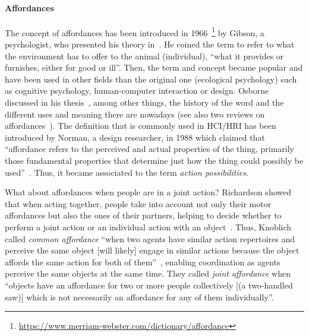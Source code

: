\documentclass[a4paper,11pt,twoside]{StyleThese}
\begin{document}
\paragraph{Affordances}
The concept of affordances has been introduced in 1966~\footnote{\url{https://www.merriam-webster.com/dictionary/affordance}} by Gibson, a psychologist, who presented his theory in~\cite{gibson_1979_theory}. He coined the term to refer to what the environment has to offer to the animal (individual), ``what it provides or furnishes, either for good or ill''. Then, the term and concept became popular and have been used in other fields than the original one (ecological psychology) such as cognitive psychology, human-computer interaction or design. Osborne discussed in his thesis~\cite{osborne_2014_ecological}, among other things, the history of the word and the different uses and meaning there are nowadays (see also two reviews on affordances~\cite{jamone_2016_affordances, bach_2014_affordance}). The definition that is commonly used in HCI/HRI has been introduced by Norman, a design researcher, in 1988 which claimed that ``affordance refers to the perceived and actual properties of the thing, primarily those fundamental properties that determine just how the thing could possibly be used''~\cite[p.~9]{norman_1988_psychology}. Thus, it became associated to the term \emph{action possibilities}. 

What about affordances when people are in a joint action? Richardson \etal{} showed that when acting together, people take into account not only their motor affordances but also the ones of their partners, helping to decide whether to perform a joint action or an individual action with an object~\cite{richardson_2007_judging}. Thus, Knoblich \etal{} called \emph{common affordance} ``when two agents have similar action repertoires and perceive the same object [will likely] engage in similar actions because the object affords the same action for both of them''~\cite[p.~63]{knoblich_2011_joint}, enabling coordination as agents perceive the same objects at the same time. They called \emph{joint affordance} when ``objects have an affordance for two or more people collectively [(a two-handled saw)] which is not necessarily an affordance for any of them individually''.
\end{document}
